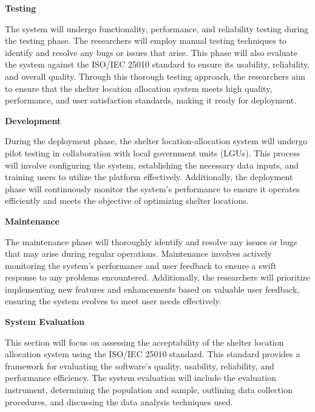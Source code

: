 \textbf{Testing}

The system will undergo functionality, performance, and reliability testing during the testing phase. The researchers will employ manual testing techniques to identify and resolve any bugs or issues that arise. This phase will also evaluate the system against the ISO/IEC 25010 standard to ensure its usability, reliability, and overall quality. Through this thorough testing approach, the researchers aim to ensure that the shelter location allocation system meets high quality, performance, and user satisfaction standards, making it ready for deployment.

\textbf{Development}

During the deployment phase, the shelter location-allocation system will undergo pilot testing in collaboration with local government units (LGUs). This process will involve configuring the system, establishing the necessary data inputs, and training users to utilize the platform effectively. Additionally, the deployment phase will continuously monitor the system's performance to ensure it operates efficiently and meets the objective of optimizing shelter locations. 

\textbf{Maintenance}

The maintenance phase will thoroughly identify and resolve any issues or bugs that may arise during regular operations. Maintenance involves actively monitoring the system's performance and user feedback to ensure a swift response to any problems encountered. Additionally, the researchers will prioritize implementing new features and enhancements based on valuable user feedback, ensuring the system evolves to meet user needs effectively.

\textbf{System Evaluation}

This section will focus on assessing the acceptability of the shelter location allocation system using the ISO/IEC 25010 standard. This standard provides a framework for evaluating the software's quality, usability, reliability, and performance efficiency. The system evaluation will include the evaluation instrument, determining the population and sample, outlining data collection procedures, and discussing the data analysis techniques used.

